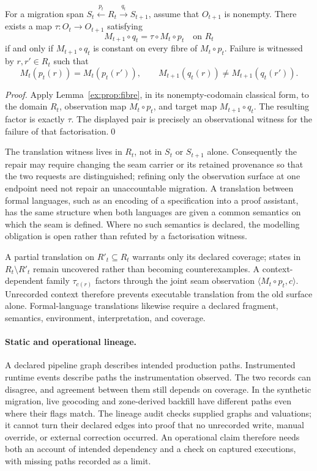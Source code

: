 \documentclass[smallextended,envcountsect,envcountsame,natbib]{svjour3}
\begin{document}
\begin{proposition}\label{ex:prop:translation-factorisation}
For a migration span $S_t\xleftarrow{p_t}R_t\xrightarrow{q_t}S_{t+1}$, assume that $O_{t+1}$ is nonempty. There exists a map $\tau:O_t\to O_{t+1}$ satisfying
\[
M_{t+1}\circ q_t=\tau\circ M_t\circ p_t
\quad\text{on }R_t
\]
if and only if $M_{t+1}\circ q_t$ is constant on every fibre of $M_t\circ p_t$. Failure is witnessed by $r,r'\in R_t$ such that
\[
M_t(p_t(r))=M_t(p_t(r')),
\qquad
M_{t+1}(q_t(r))\neq M_{t+1}(q_t(r')).
\]
\end{proposition}

\begin{proof}
Apply Lemma~\ref{ex:prop:fibre}, in its nonempty-codomain classical form, to the domain $R_t$, observation map $M_t\circ p_t$, and target map $M_{t+1}\circ q_t$. The resulting factor is exactly $\tau$. The displayed pair is precisely an observational witness for the failure of that factorisation.\qed
\end{proof}

The translation witness lives in $R_t$, not in $S_t$ or $S_{t+1}$ alone. Consequently the repair may require changing the seam carrier or its retained provenance so that the two requests are distinguished; refining only the observation surface at one endpoint need not repair an unaccountable migration. A translation between formal languages, such as an encoding of a specification into a proof assistant, has the same structure when both languages are given a common semantics on which the seam is defined. Where no such semantics is declared, the modelling obligation is open rather than refuted by a factorisation witness.

A partial translation on $R'_t\subseteq R_t$ warrants only its declared coverage; states in $R_t\setminus R'_t$ remain uncovered rather than becoming counterexamples. A context-dependent family $\tau_{c(r)}$ factors through the joint seam observation $\langle M_t\circ p_t,c\rangle$. Unrecorded context therefore prevents executable translation from the old surface alone. Formal-language translations likewise require a declared fragment, semantics, environment, interpretation, and coverage.

\paragraph{Static and operational lineage.} A declared pipeline graph describes intended production paths. Instrumented runtime events describe paths the instrumentation observed. The two records can disagree, and agreement between them still depends on coverage. In the synthetic migration, live geocoding and zone-derived backfill have different paths even where their flags match. The lineage audit checks supplied graphs and valuations; it cannot turn their declared edges into proof that no unrecorded write, manual override, or external correction occurred. An operational claim therefore needs both an account of intended dependency and a check on captured executions, with missing paths recorded as a limit.
\end{document}

